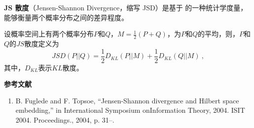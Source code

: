 

\textbf{JS 散度}（Jensen-Shannon Divergence，缩写 JSD）是基于 的一种统计学度量，能够衡量两个概率分布之间的差异程度。

设概率空间上有两个概率分布$P$和$Q$，$M=\frac{1}{2}(P+Q)$，为$P$和$Q$的平均，则，$P$和$Q$的$JS$散度定义为
\begin{equation}
JSD(P||Q)=\frac{1}{2}D_{KL}(P||M)+\frac{1}{2}D_{KL}(Q||M)~,
\end{equation}
其中，$D_{KL}$表示$KL$散度。



\textbf{参考文献}
\begin{enumerate}
\item B. Fuglede and F. Topsoe, “Jensen-Shannon divergence and Hilbert space embedding,” in International Symposium onInformation Theory, 2004. ISIT 2004. Proceedings., 2004, p. 31–.
\end{enumerate}